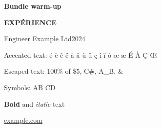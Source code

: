 \documentclass[11pt,a4paper]{article}
\begin{document}
{\centering
\color{cvheading}\LARGE\bfseries Bundle warm-up\par}


{\color{cvheading}\bfseries EXPÉRIENCE}\par
\noindent\textcolor{cvheading}{Engineer \textemdash{} Example Ltd}\hfill{\footnotesize\color{cvmuted}2024}\par

\begin{list}{\textbullet}{\setlength{\leftmargin}{4.5mm}\setlength{\labelwidth}{2mm}\setlength{\topsep}{0.6mm}\setlength{\itemsep}{0.4mm}\setlength{\parsep}{0pt}\setlength{\partopsep}{0pt}}
  \item Accented text: é è ê ë à â ù û ç î ï ô œ æ É À Ç Œ
  \item Escaped text: 100\% of \$5, C\#, A\_B, \&
  \item Symbols: A\textemdash{}B{} \textperiodcentered{} C\textbullet{}D
  \item \textbf{Bold} and \textit{italic} text
\end{list}

\href{https://example.com}{example.com}
\end{document}
